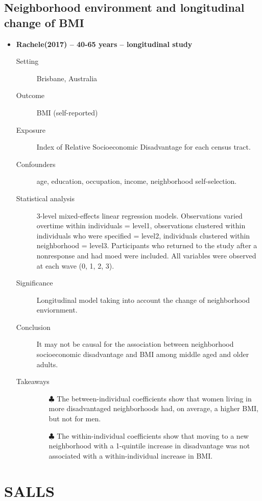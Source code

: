 \documentclass{article}
\begin{document}
\subsection{Neighborhood environment and longitudinal change of BMI}
\begin{itemize}
	\item{\bf Rachele(2017) -- 40-65 years -- longitudinal study} 
		\begin{description}
			\item[Setting] Brisbane, Australia
			\item[Outcome] BMI (self-reported)
			\item[Exposure] Index of Relative Socioeconomic Disadvantage for each census tract.
			\item[Confounders] age, education, occupation, income, neighborhood self-selection.
			\item[Statistical analysis] 3-level mixed-effects linear regression models. Observations varied overtime within individuals = level1, observations clustered within individuals who were specified = level2, individuals clustered within neighborhood = level3. Participants who returned to the study after a nonresponse and had moed were included. All variables were  observed at each wave (0, 1, 2, 3).
			\item[Significance] Longitudinal model taking into account the change of neighborhood enviornment.
			\item[Conclusion] It may not be causal for the association between neighborhood socioeconomic disadvantage and BMI among middle aged and older adults.
			\item[Takeaways] \mbox{}\par
				\begin{itemize}
					\item[$\clubsuit$] The between-individual coefficients show that women living in more disadvantaged neighborhoods had, on average, a higher BMI, but not for men. 
					\item[$\clubsuit$] The within-individual coefficients show that moving to a new neighborhood with a 1-quintile increase in disadvantage was not associated with a within-individual increase in BMI.
				\end{itemize}
		\end{description}
\end{itemize}

\section{SALLS}
\end{document}

